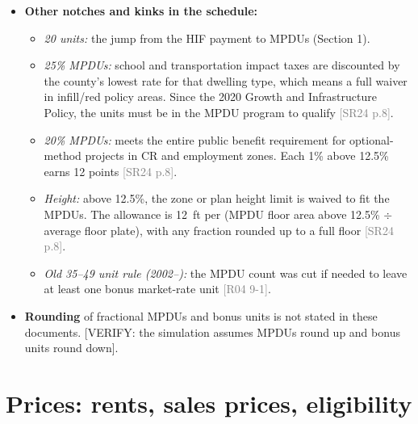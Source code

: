 \documentclass[11pt]{article}
\newcommand{\verify}[1]{\textcolor{red!70!black}{[VERIFY: #1]}}
\newcommand{\src}[1]{\textcolor{gray}{\small[#1]}}
\begin{document}
\begin{itemize}
\begin{itemize}
      \item Under the 1988--2014 schedule, the marginal share was about 0.23--0.27 up to a 20\% bonus and about 0.45 from 20\% to 22\%, then the cap. Bunching at 15\%/22\% would be a corner solution.
    \end{itemize}
  \item \textbf{Other notches and kinks in the schedule:}
    \begin{itemize}
      \item \emph{20 units:} the jump from the HIF payment to MPDUs (Section 1).
      \item \emph{25\% MPDUs:} school and transportation impact taxes are discounted by the county's lowest rate for that dwelling type, which means a full waiver in infill/red policy areas. Since the 2020 Growth and Infrastructure Policy, the units must be in the MPDU program to qualify \src{SR24 p.8}.
      \item \emph{20\% MPDUs:} meets the entire public benefit requirement for optional-method projects in CR and employment zones. Each 1\% above 12.5\% earns 12 points \src{SR24 p.8}.
      \item \emph{Height:} above 12.5\%, the zone or plan height limit is waived to fit the MPDUs. The allowance is 12~ft per (MPDU floor area above 12.5\% $\div$ average floor plate), with any fraction rounded up to a full floor \src{SR24 p.8}.
      \item \emph{Old 35--49 unit rule (2002--):} the MPDU count was cut if needed to leave at least one bonus market-rate unit \src{R04 9-1}.
    \end{itemize}
  \item \textbf{Rounding} of fractional MPDUs and bonus units is not stated in these documents. \verify{the simulation assumes MPDUs round up and bonus units round down}.
\end{itemize}

\section{Prices: rents, sales prices, eligibility}\label{sec:prices}
\end{document}
